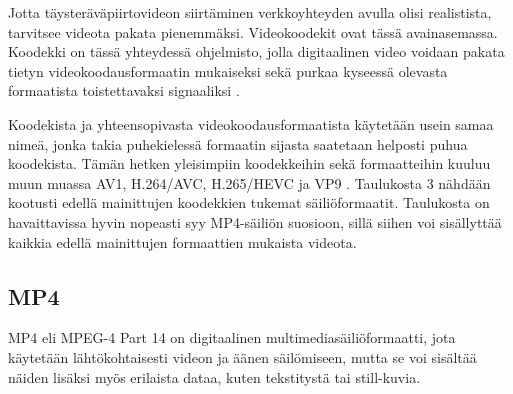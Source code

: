 \documentclass[finnish, 12pt, a4paper, elec, utf8, a-1b, online]{aaltothesis}
\begin{document}
\noindent Jotta täysteräväpiirtovideon siirtäminen verkkoyhteyden avulla olisi realistista, tarvitsee videota pakata pienemmäksi. Videokoodekit ovat tässä avainasemassa. Koodekki on tässä yhteydessä ohjelmisto, jolla digitaalinen video voidaan pakata tietyn videokoodausformaatin mukaiseksi sekä purkaa kyseessä olevasta formaatista toistettavaksi signaaliksi \cite{Codec}.

\noindent Koodekista ja yhteensopivasta videokoodausformaatista käytetään usein samaa nimeä, jonka takia puhekielessä formaatin sijasta saatetaan helposti puhua koodekista. Tämän hetken yleisimpiin koodekkeihin sekä formaatteihin kuuluu muun muassa AV1, H.264/AVC, H.265/HEVC ja VP9 \cite{Codec guide}. Taulukosta 3 nähdään kootusti edellä mainittujen koodekkien tukemat säiliöformaatit. Taulukosta on havaittavissa hyvin nopeasti syy MP4-säiliön suosioon, sillä siihen voi sisällyttää kaikkia edellä mainittujen formaattien mukaista videota. \\

\begin{table}[htb]
  \caption{Suosittuja videokoodekkeja ja niiden säiliöitä. \cite{Codec guide} \label{taulukko3}}
  \centering
\end{table}

\subsection*{MP4}

MP4 eli MPEG-4 Part 14 on digitaalinen multimediasäiliöformaatti, jota käytetään lähtökohtaisesti videon ja äänen säilömiseen, mutta se voi sisältää näiden lisäksi myös erilaista dataa, kuten tekstitystä tai still-kuvia. \\

\end{document}
